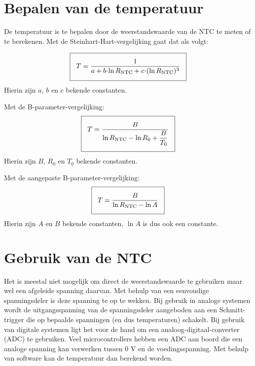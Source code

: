 \documentclass[12pt,a4paper,final,twoside,fleqn]{article}
\newcommand{\rntc}{R_\text{NTC}}
\let\oldcdot\cdot
\renewcommand{\cdot}{\kern-.10em\oldcdot\kern-.10em}
\begin{document}
\clearpage
\section{Bepalen van de temperatuur}
\label{sec:bepalentemperatuur}
De temperatuur is te bepalen door de weerstandswaarde van de NTC te meten of te
berekenen.
Met de Steinhart-Hart-vergelijking gaat dat als volgt:

\begin{equation}
\label{equ:invertedsteinharthart}
\setlength\fboxsep{2ex}
\boxed{T = \dfrac{1}{a + b\cdot\ln \rntc + c\cdot( \ln \rntc )^3}}
\end{equation}
Hierin zijn $a$, $b$ en $c$ bekende constanten.

Met de B-parameter-vergelijking:
\begin{equation}
\label{equ:invertedsteinharthartsimpl}
\setlength\fboxsep{2ex}
\boxed{T = \dfrac{B}{\ln \rntc - \ln R_0 + \dfrac{B}{T_0}}}
\end{equation}
Hierin zijn $B$, $R_0$ en $T_0$ bekende constanten.


Met de aangepaste B-parameter-vergelijking:
\begin{equation}
\label{equ:invertedsteinharthartadapt}
\setlength\fboxsep{2ex}
\boxed{T = \dfrac{B}{\ln \rntc - \ln A}}
\end{equation}
Hierin zijn $A$ en $B$ bekende constanten, $\ln A$ is dus ook een constante.


\clearpage
\section{Gebruik van de NTC}
\label{sec:gebruik}
Het is meestal niet mogelijk om direct de weerstandswaarde te gebruiken maar
wel een afgeleide spanning daarvan. Met behulp van een eenvoudige spanningsdeler
is deze spanning te op te wekken. Bij gebruik in analoge systemen wordt de
uitgangsspanning van de spanningsdeler aangeboden aan een Schmitt-trigger die op
bepaalde spanningen (en dus temperaturen) schakelt.
Bij gebruik van digitale systemen ligt het voor de hand
om een analoog-digitaal-converter (ADC) te gebruiken. Veel microcontrollers hebben
een ADC aan boord die een analoge spanning kan verwerken tussen 0 V en de
voedingsspanning. Met behulp van software kan de temperatuur dan berekend worden.
\end{document}
